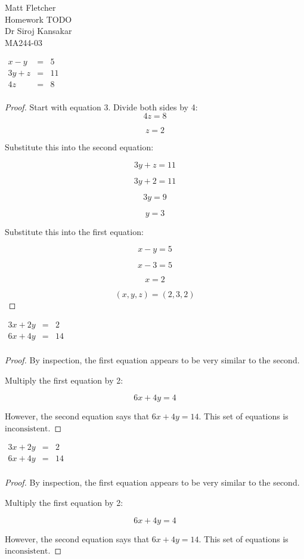 \documentclass[10pt]{article}
\newenvironment{problem}[2][Problem]{\begin{trivlist}
\item[\hskip \labelsep {\bfseries #1}\hskip \labelsep {\bfseries #2.}]}{\end{trivlist}}
\begin{document}
 

 
Matt Fletcher
\\Homework TODO
\\Dr Siroj Kansakar
\\MA244-03

 
\begin{problem}{28}
$
\begin{array}
	 {rcr} x-y & = & 5 \\ 
	     3y+z & = & 11 \\
       	4z  & = & 8 \\
\end{array}
$
\end{problem}
 
\begin{proof}
Start with equation 3. Divide both sides by 4: \\
\[4z=8\]

\[\boxed{z=2}\]

Substitute this into the second equation:

\[3y+z = 11\]

\[3y+2=11\]

\[3y=9\]

\[\boxed{y=3}\]

Substitute this into the first equation:

\[x-y=5\]

\[x-3=5\]

\[\boxed{x=2}\]

\[\boxed{(x,y,z)=(2,3,2)}\]
\end{proof}



\begin{problem}{38}
	$
	\begin{array}
	{rcr} 3x+2y & = & 2 \\ 
	6x+4y & = & 14 \\
	\end{array}
	$
\end{problem}

\begin{proof}
	By inspection, the first equation appears to be very similar to the second. 
	
	Multiply the first equation by 2:
	
	\[6x+4y = 4\]
	
	However, the second equation says that $6x+4y = 14$. This set of equations is $\boxed{\text{inconsistent}}$.
\end{proof}


\begin{problem}{48TODO}
	$
	\begin{array}
	{rcr} 3x+2y & = & 2 \\ 
	6x+4y & = & 14 \\
	\end{array}
	$
\end{problem}

\begin{proof}
	By inspection, the first equation appears to be very similar to the second. 
	
	Multiply the first equation by 2:
	
	\[6x+4y = 4\]
	
	However, the second equation says that $6x+4y = 14$. This set of equations is $\boxed{\text{inconsistent}}$.
\end{proof}
\end{document}
